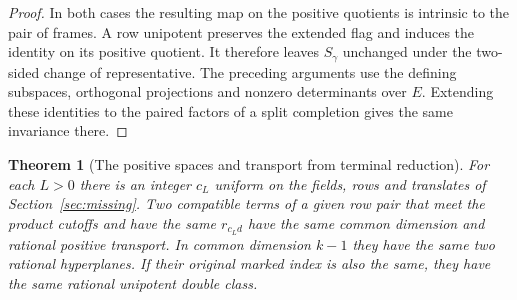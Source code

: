 \documentclass[a4paper,11pt]{article}
\newtheorem{theorem}[proposition]{Theorem}
\theoremstyle{definition}
\theoremstyle{remark}
\numberwithin{equation}{section}
\begin{document}
\begin{proof}
In both cases the resulting map on the positive quotients
is intrinsic to the pair of frames. A row unipotent preserves
the extended flag and induces the identity on its positive
quotient. It therefore leaves \(S_\gamma\) unchanged under the
two-sided change of representative. The preceding arguments
use the defining subspaces, orthogonal projections and
nonzero determinants over \(E\). Extending these identities
to the paired factors of a split completion gives the same
invariance there.
\end{proof}

\begin{theorem}[The positive spaces and transport from terminal reduction]
\leavevmode\label{thm:allterminaltransports641}
For each \(L>0\) there is an integer \(c_L\) uniform on the
fields, rows and translates of Section~\ref{sec:missing}.
Two compatible terms of a given row pair that meet the product
cutoffs and have the same \(r_{c_Ld}\) have the same common
dimension and rational positive transport. In common dimension
\(k-1\) they have the same two rational hyperplanes. If their
original marked index is also the same, they have the same
rational unipotent double class.
\end{theorem}
\end{document}
